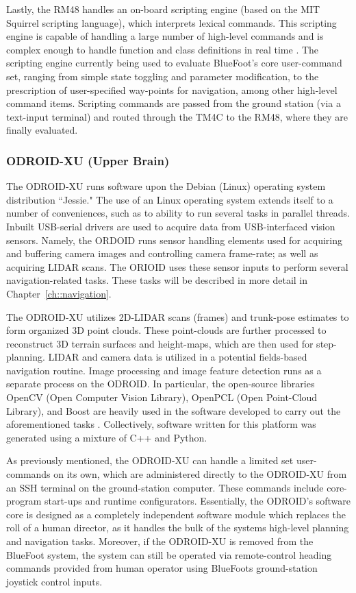 			Lastly, the RM48 handles an on-board scripting engine (based on the MIT Squirrel scripting language), which interprets lexical commands. This scripting engine is capable of handling a large number of high-level commands and is complex enough to handle function and class definitions in real time \cite{Squirrel_website}. The scripting engine currently being used to evaluate BlueFoot's core user-command set, ranging from simple state toggling and parameter modification, to the prescription of user-specified way-points for navigation, among other high-level command items. Scripting commands are passed from the ground station (via a text-input terminal) and routed through the TM4C to the RM48, where they are finally evaluated.

		\subsubsection{ODROID-XU (Upper Brain)}

			The ODROID-XU runs software upon the Debian (Linux) operating system distribution ``Jessie." The use of an Linux operating system extends itself to a number of conveniences, such as to ability to run several tasks in parallel threads. Inbuilt USB-serial drivers are used to acquire data from USB-interfaced vision sensors. Namely, the ORDOID runs sensor handling elements used for acquiring and buffering camera images and controlling camera frame-rate; as well as acquiring LIDAR scans. The ORIOID uses these sensor inputs to perform several navigation-related tasks. These tasks will be described in more detail in Chapter~\ref{ch::navigation}.

			The ODROID-XU utilizes 2D-LIDAR scans (frames) and trunk-pose estimates to form organized 3D point clouds. These point-clouds are further processed to reconstruct 3D terrain surfaces and height-maps, which are then used for step-planning. LIDAR and camera data is utilized in a potential fields-based navigation routine. Image processing and image feature detection runs as a separate process on the ODROID. In particular, the open-source libraries OpenCV (Open Computer Vision Library), OpenPCL (Open Point-Cloud Library), and Boost are heavily used in the software developed to carry out the aforementioned tasks \cite{opencv_library,openpcl_library,boost_website}. Collectively, software written for this platform was generated using a mixture of C++ and Python.

			As previously mentioned, the ODROID-XU can handle a limited set user-commands on its own, which are administered directly to the ODROID-XU from an SSH terminal on the ground-station computer. These commands include core-program start-ups and runtime configurators. Essentially, the ODROID's software core is designed as a completely independent software module which replaces the roll of a human director, as it handles the bulk of the systems high-level planning and navigation tasks. Moreover, if the ODROID-XU is removed from the BlueFoot system, the system can still be operated via remote-control heading commands provided from human operator using BlueFoots ground-station joystick control inputs.
		
